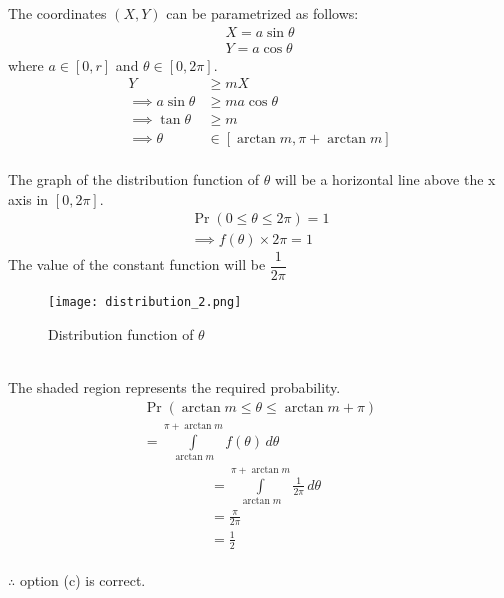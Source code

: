 \documentclass[journal,12pt,twocolumn]{IEEEtran}
\providecommand{\pr}[1]{\ensuremath{\Pr\left(#1\right)}}
\theoremstyle{remark}
\numberwithin{equation}{subsection}
\begin{document}
The coordinates $(X,Y)$ can be parametrized as follows:
\begin{align}
    X = a\sin\theta\\
    Y = a\cos\theta
\end{align} 
where $a \in [0,r]$ and $\theta \in [0, 2\pi]$. 
\begin{align}
    Y &\geq mX\\
    \implies a\sin\theta &\geq ma\cos\theta\\
    \implies \tan\theta &\geq m\\
    \implies \theta &\in [\arctan m, \pi+\arctan m]
\end{align}\\
The graph of the distribution function of $\theta$ will be a horizontal line above the x axis in $[0,2\pi]$.
\begin{align}
    \pr{0\leq\theta\leq2\pi} = 1\\
    \implies f(\theta)\times2\pi=1
\end{align}
The value of the constant function will be $\dfrac{1}{2\pi}$
\begin{figure}[h]
    \centering
    \texttt{[image: distribution\_2.png]}
    \caption{Distribution function of $\theta$}
    \label{fig:my_label}
\end{figure}\\
The shaded region represents the required probability. 
\begin{align}
    \pr{\arctan m\leq\theta\leq\arctan m +\pi}\nonumber\\
    =\displaystyle\int\limits_{\arctan m}^{\pi + \arctan m} f(\theta) \,d\theta
\end{align}
\begin{align}
    &=\displaystyle\int\limits_{\arctan m}^{\pi + \arctan m} \frac{1}{2\pi} \,d\theta\\
    &=\frac{\pi}{2\pi}\\
    &=\frac{1}{2}
\end{align}
\\ $\therefore$ option (c) is correct.
\end{document}
